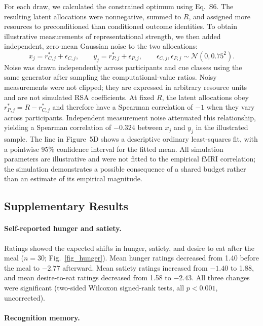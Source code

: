 \documentclass[9pt,twoside,lineno]{pnas-new}
\begin{document}
For each draw, we calculated the constrained optimum using Eq.~S6. The resulting latent allocations were nonnegative, summed to $R$, and assigned more resources to preconditioned than conditioned outcome identities. To obtain illustrative measurements of representational strength, we then added independent, zero-mean Gaussian noise to the two allocations:
\begin{equation}
x_j=r_{C,j}^*+\epsilon_{C,j},\qquad y_j=r_{P,j}^*+\epsilon_{P,j},\qquad
\epsilon_{C,j},\epsilon_{P,j}\sim\mathcal{N}(0,0.75^2).
\tag{S8}
\end{equation}
Noise was drawn independently across participants and cue classes using the same generator after sampling the computational-value ratios. Noisy measurements were not clipped; they are expressed in arbitrary resource units and are not simulated RSA coefficients. At fixed $R$, the latent allocations obey $r_{P,j}^*=R-r_{C,j}^*$ and therefore have a Spearman correlation of $-1$ when they vary across participants. Independent measurement noise attenuated this relationship, yielding a Spearman correlation of $-0.324$ between $x_j$ and $y_j$ in the illustrated sample. The line in Figure~5D shows a descriptive ordinary least-squares fit, with a pointwise 95\% confidence interval for the fitted mean. All simulation parameters are illustrative and were not fitted to the empirical fMRI correlation; the simulation demonstrates a possible consequence of a shared budget rather than an estimate of its empirical magnitude.

\subsection*{Supplementary Results}

\paragraph*{Self-reported hunger and satiety.}

Ratings showed the expected shifts in hunger, satiety, and desire to eat after the meal ($n = 30$; Fig.~\ref{fig_hunger}). Mean hunger ratings decreased from 1.40 before the meal to $-2.77$ afterward. Mean satiety ratings increased from $-1.40$ to 1.88, and mean desire-to-eat ratings decreased from 1.58 to $-2.43$. All three changes were significant (two-sided Wilcoxon signed-rank tests, all $p < 0.001$, uncorrected).

\paragraph*{Recognition memory.}
\end{document}
